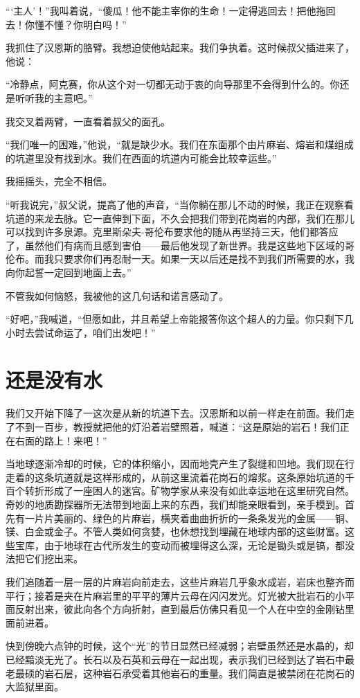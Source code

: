 \documentclass[10pt]{book}
\begin{document}
“‘主人’！”我叫着说，“傻瓜！他不能主宰你的生命！一定得逃回去！把他拖回去！你懂不懂？你明白吗！”

我抓住了汉恩斯的胳臂。我想迫使他站起来。我们争执着。这时候叔父插进来了，他说：

“冷静点，阿克赛，你从这个对一切都无动于衷的向导那里不会得到什么的。你还是听听我的主意吧。”

我交叉着两臂，一直看着叔父的面孔。

“我们唯一的困难，”他说，“就是缺少水。我们在东面那个由片麻岩、熔岩和煤组成的坑道里没有找到水。我们在西面的坑道内可能会比较幸运些。”

我摇摇头，完全不相信。

“听我说完，”叔父说，提高了他的声音，“当你躺在那儿不动的时候，我正在观察看坑道的来龙去脉。它一直伸到下面，不久会把我们带到花岗岩的内部，我们在那儿可以找到许多泉源。克里斯朵夫-哥伦布要求他的随从再坚持三天，他们都答应了，虽然他们有病而且感到害伯——最后他发现了新世界。我是这些地下区域的哥伦布。而我只要求你们再忍耐一天。如果一天以后还是找不到我们所需要的水，我向你起誓一定回到地面上去。”

不管我如何恼怒，我被他的这几句话和诺言感动了。

“好吧，”我喊道，“但愿如此，并且希望上帝能报答你这个超人的力量。你只剩下几小时去尝试命运了，咱们出发吧！”
\chapter{还是没有水}
我们又开始下降了一这次是从新的坑道下去。汉恩斯和以前一样走在前面。我们走了不到一百步，教授就把他的灯沿着岩壁照着，喊道：“这是原始的岩石！我们正在右面的路上！来吧！”

当地球逐渐冷却的时候，它的体积缩小，因而地壳产生了裂缝和凹地。我们现在行走着的这条坑道就是这样形成的，从前这里流着花岗石的熔浆。这条原始坑道的千百个转折形成了一座困人的迷宫。矿物学家从来没有如此幸运地在这里研究自然。奇妙的地质勘探器所无法带到地面上来的东西，我们却能亲眼看到，亲手模到。首先有一片片美丽的、绿色的片麻岩，横夹着曲曲折折的一条条发光的金属——铜、镁、白金或金子。不管人类如何贪婪，也休想找到埋藏在地球内部的这些财富。这些宝库，由于地球在古代所发生的变动而被埋得这么深，无论是锄头或是镐，都没法把它们挖出来。

我们追随着一层一层的片麻岩向前走去，这些片麻岩几乎象水成岩，岩床也整齐而平行；接着是夹在片麻岩里的平平的薄片云母在闪闪发光。灯光被大批岩石的小平面反射出来，彼此向各个方向折射，直到最后仿佛只看见一个人在中空的金刚钻里面前进着。

快到傍晚六点钟的时候，这个“光”的节日显然已经减弱；岩壁虽然还是水晶的，却已经黯淡无光了。长石以及石英和云母在一起出现，表示我们已经到达了岩石中最老最硕的岩石层，这种岩石承受着其他岩石的重量。我们简直是被禁闭在花岗石的大监狱里面。
\end{document}
